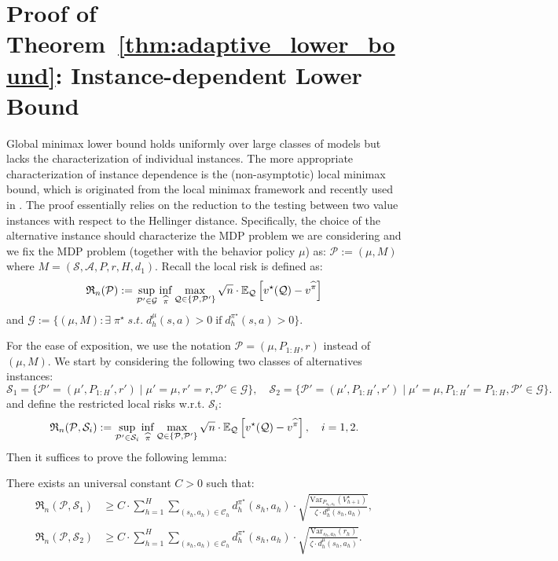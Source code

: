 \section{Proof of Theorem~\ref{thm:adaptive_lower_bound}: Instance-dependent Lower Bound}\label{sec:proof_lower_bound}


Global minimax lower bound holds uniformly over large classes of models but lacks the characterization of individual instances. The more appropriate characterization of instance dependence is the (non-asymptotic) local minimax bound, which is originated from the local minimax framework \cite{cai2004adaptation} and recently used in \cite{khamaru2020temporal,khamaru2021instance}. The proof essentially relies on the reduction to the testing between two value instances with respect to the Hellinger distance. Specifically, the choice of the alternative instance should characterize the MDP problem we are considering and we fix the MDP problem (together with the behavior policy $\mu$) as: $\mathcal{P}:=(\mu,M)$ where $M=(\mathcal{S}, \mathcal{A}, P, r, H, d_1)$. Recall the local risk is defined as:
\[
\mathfrak{R}_{n}(\mathcal{P}):=\sup_{\mathcal{P}'\in\mathcal{G}}\inf_{\widehat{\pi}}\max_{\mathcal{Q}\in\{\mathcal{P},\mathcal{P}'\}}\sqrt{n}\cdot\mathbb{E}_{\mathcal{Q}}\left[v^\star(\mathcal{Q})-v^{\widehat{\pi}}\right]
\]
and $\mathcal{G}:=\{(\mu,M): \exists\; \pi^\star\;s.t. \; d^\mu_h(s,a)>0\;\text{if}\;d^{\pi^\star}_h(s,a)>0\}$.



For the ease of exposition, we use the notation $\mathcal{P}=(\mu,P_{1:H},r)$ instead of $(\mu,M)$. We start by considering the following two classes of alternatives instances:
\begin{equation}\label{eqn:S1S2}
\mathcal{S}_1=\{\mathcal{P}'=(\mu',P_{1:H}',r')\mid \mu'=\mu,r'=r,\mathcal{P}'\in\mathcal{G}\},\quad \mathcal{S}_2=\{\mathcal{P}'=(\mu',P_{1:H}',r')\mid \mu'=\mu,P_{1:H}'=P_{1:H},\mathcal{P}'\in\mathcal{G}\}.
\end{equation}
and define the restricted local risks w.r.t. $\mathcal{S}_i$:
\begin{equation}
\mathfrak{R}_{n}(\mathcal{P},\mathcal{S}_i):=\sup_{\mathcal{P}'\in\mathcal{S}_i}\inf_{\widehat{\pi}}\max_{\mathcal{Q}\in\{\mathcal{P},\mathcal{P}'\}}\sqrt{n}\cdot\mathbb{E}_{\mathcal{Q}}\left[v^\star(\mathcal{Q})-v^{\widehat{\pi}}\right],\quad i=1,2.
\end{equation}
Then it suffices to prove the following lemma:
\begin{lemma}\label{lem:lower_key}
	There exists an universal constant $C>0$ such that:
	\begin{align*}
	\mathfrak{R}_{n}(\mathcal{P},\mathcal{S}_1)&\geq C\cdot {\sum_{h=1}^H\sum_{(s_h,a_h)\in\mathcal{C}_h}d^{\pi^\star}_h(s_h,a_h)\cdot\sqrt{\frac{\mathrm{Var}_{P_{s_h,a_h}}(V^\star_{h+1})}{ \zeta\cdot d^\mu_h{(s_h,a_h)}}}},\\
	\mathfrak{R}_{n}(\mathcal{P},\mathcal{S}_2)&\geq C\cdot {\sum_{h=1}^H\sum_{(s_h,a_h)\in\mathcal{C}_h}d^{\pi^\star}_h(s_h,a_h)\cdot\sqrt{\frac{\mathrm{Var}_{s_h,a_h}(r_h)}{ \zeta\cdot d^\mu_h{(s_h,a_h)}}}}.\\
	\end{align*}
\end{lemma}

